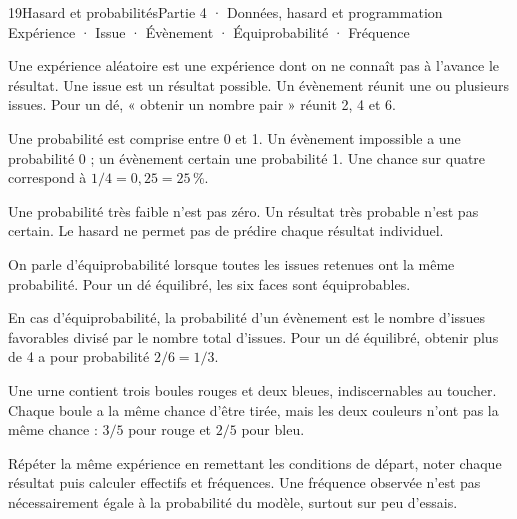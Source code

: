 \begin{ouverture}[probabilites]{19}{Hasard et probabilités}{Partie 4 · Données, hasard et programmation}
{Expérience · Issue · Évènement · Équiprobabilité · Fréquence}
\end{ouverture}
\pagestyle{otMain}\essentiel\fontsize{11}{15}\selectfont
{}\label{cours-19-1}
\begin{definition}Une expérience aléatoire est une expérience dont on ne connaît pas à l’avance le résultat. Une issue est un résultat possible. Un évènement réunit une ou plusieurs issues. Pour un dé, « obtenir un nombre pair » réunit 2, 4 et 6.\end{definition}
\label{fig-cours-19-1-cours-probabilites}

\begin{propriete}Une probabilité est comprise entre 0 et 1. Un évènement impossible a une probabilité 0 ; un évènement certain une probabilité 1. Une chance sur quatre correspond à $1/4=0{,}25=25\,\%$.\end{propriete}
\begin{attention}Une probabilité très faible n’est pas zéro. Un résultat très probable n’est pas certain. Le hasard ne permet pas de prédire chaque résultat individuel.\end{attention}
\clearpage
{}\label{cours-19-2}
\begin{definition}On parle d’équiprobabilité lorsque toutes les issues retenues ont la même probabilité. Pour un dé équilibré, les six faces sont équiprobables.\end{definition}
\begin{propriete}En cas d’équiprobabilité, la probabilité d’un évènement est le nombre d’issues favorables divisé par le nombre total d’issues. Pour un dé équilibré, obtenir plus de 4 a pour probabilité $2/6=1/3$.\end{propriete}
\begin{exemple}Une urne contient trois boules rouges et deux bleues, indiscernables au toucher. Chaque boule a la même chance d’être tirée, mais les deux couleurs n’ont pas la même chance : $3/5$ pour rouge et $2/5$ pour bleu.\end{exemple}
\begin{savoirfaire}Répéter la même expérience en remettant les conditions de départ, noter chaque résultat puis calculer effectifs et fréquences. Une fréquence observée n’est pas nécessairement égale à la probabilité du modèle, surtout sur peu d’essais.\end{savoirfaire}

